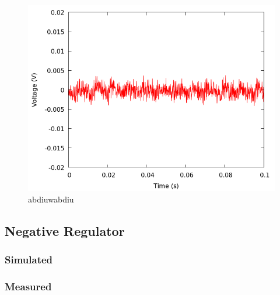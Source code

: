 \documentclass[12pt]{article}
\newcommand{\graphwidth}{0.5\linewidth}
\begin{document}
\begin{appendix}
\begin{figure}[H]
    \centering
    \includegraphics[width=\graphwidth]{./res/image/pos-noload-ripple.png}
    \caption{abdiuwabdiu}
    \label{fig:pos_noload_ripple}
\end{figure}

\subsection{Negative Regulator}

\subsubsection{Simulated}

\subsubsection{Measured}

\end{appendix}
\end{document}
